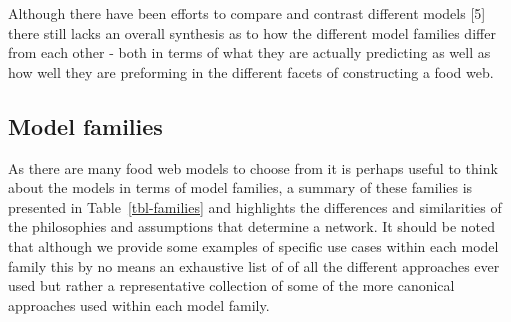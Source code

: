 \documentclass[
]{article}
\begin{document}
Although there have been efforts to compare and contrast different
models {[}5{]} there still lacks an overall synthesis as to how the
different model families differ from each other - both in terms of what
they are actually predicting as well as how well they are preforming in
the different facets of constructing a food web.

\subsection{Model families}\label{model-families}

As there are many food web models to choose from it is perhaps useful to
think about the models in terms of model families, a summary of these
families is presented in Table~\ref{tbl-families} and highlights the
differences and similarities of the philosophies and assumptions that
determine a network. It should be noted that although we provide some
examples of specific use cases within each model family this by no means
an exhaustive list of of all the different approaches ever used but
rather a representative collection of some of the more canonical
approaches used within each model family.
\end{document}
